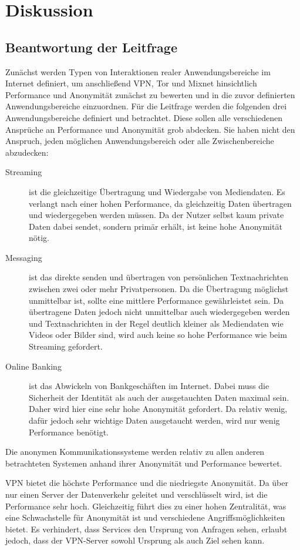 \section{Diskussion}

\subsection{Beantwortung der Leitfrage}

Zunächst werden Typen von Interaktionen realer Anwendungsbereiche im Internet definiert, um anschließend VPN, Tor und Mixnet hinsichtlich Performance und Anonymität zunächst zu bewerten und in die zuvor definierten Anwendungsbereiche einzuordnen.
Für die Leitfrage werden die folgenden drei Anwendungsbereiche definiert und betrachtet. Diese sollen alle verschiedenen Ansprüche an Performance und Anonymität grob abdecken. Sie haben nicht den Anspruch, jeden möglichen Anwendungsbereich oder alle Zwischenbereiche abzudecken:

\begin{description}
    \item[Streaming] ist die gleichzeitige Übertragung und Wiedergabe von Mediendaten. Es verlangt nach einer hohen Performance, da gleichzeitig Daten übertragen und wiedergegeben werden müssen. Da der Nutzer selbst kaum private Daten dabei sendet, sondern primär erhält, ist keine hohe Anonymität nötig.
    \item[Messaging] ist das direkte senden und übertragen von persönlichen Textnachrichten zwischen zwei oder mehr Privatpersonen. Da die Übertragung möglichst unmittelbar ist, sollte eine mittlere Performance gewährleistet sein. Da übertragene Daten jedoch nicht unmittelbar auch wiedergegeben werden und Textnachrichten in der Regel deutlich kleiner als Mediendaten wie Videos oder Bilder sind, wird auch keine so hohe Performance wie beim Streaming gefordert.
    \item[Online Banking] ist das Abwickeln von Bankgeschäften im Internet. Dabei muss die Sicherheit der Identität als auch der ausgetauchten Daten maximal sein. Daher wird hier eine sehr hohe Anonymität gefordert. Da relativ wenig, dafür jedoch sehr wichtige Daten ausgetaucht werden, wird nur wenig Performance benötigt.
\end{description}

Die anonymen Kommunikationssysteme werden relativ zu allen anderen betrachteten Systemen anhand ihrer Anonymität und Performance bewertet.

VPN bietet die höchste Performance und die niedriegste Anonymität. Da über nur einen Server der Datenverkehr geleitet und verschlüsselt wird, ist die Performance sehr hoch. Gleichzeitig führt dies zu einer hohen Zentralität, was eine Schwachstelle für Anonymität ist und verschiedene Angriffsmöglichkeiten bietet. Es verhindert, dass Services den Ursprung von Anfragen sehen, erlaubt jedoch, dass der VPN-Server sowohl Ursprung als auch Ziel sehen kann.

